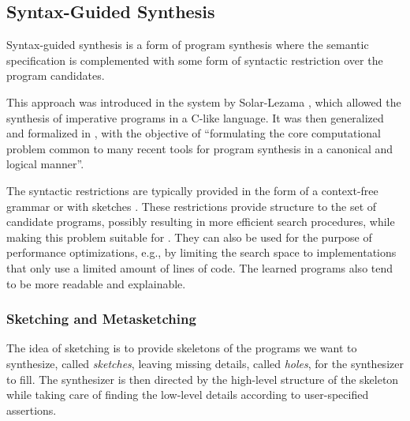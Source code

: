 \subsection{Syntax-Guided Synthesis}
\label{sec:sygus}



Syntax-guided synthesis is a form of program synthesis where the semantic
specification is complemented with some form of syntactic restriction over the
program candidates.

This approach was introduced in the  system by Solar-Lezama \cite{Solar-Lezama:2008}, which allowed the
synthesis of imperative programs in a C-like language.
It was then generalized and formalized in \cite{Alur:sygus:2013}, with the
objective of ``formulating the core computational problem common to many recent
tools for program synthesis in a canonical and logical manner''.

The syntactic restrictions are typically provided in the form of a context-free
grammar \cite{Alur:sygus:2013} or with sketches \cite{Solar-Lezama:2008}.
These restrictions provide structure to the set of candidate programs, possibly
resulting in more efficient search procedures, while making this problem
suitable for  \cite{Alur:sygus:2013}. They can also be used for the purpose of
performance optimizations, e.g., by limiting the search space to implementations
that only use a limited amount of lines of code.
The learned programs also tend to be more readable and explainable.


\subsubsection{Sketching and Metasketching}
\label{sec:sketching}


The idea of sketching is to provide skeletons of the programs we want to
synthesize, called \textit{sketches}, leaving missing details, called
\textit{holes}, for the synthesizer to fill.
The synthesizer is then directed by the high-level structure of the skeleton
while taking care of finding the low-level details according to user-specified
assertions.


